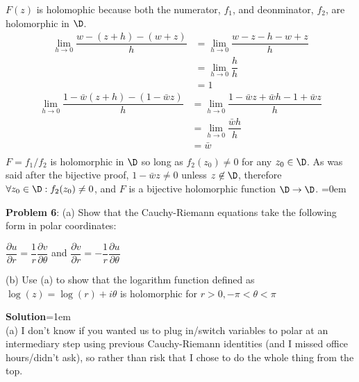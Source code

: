 \documentclass{article}
\begin{document}
$F(z)$ is holomophic because both the numerator, $f_1$, and deonminator, $f_2$, are holomorphic in $\D$.
\begin{align*}
    \lim\limits_{h\to 0} \dfrac{w - (z + h) - (w + z)}{h} &= \lim\limits_{h\to 0} \dfrac{w - z - h - w + z}{h}\\
    &= \lim\limits_{h\to 0} \dfrac{h}{h}\\
    &= 1
\end{align*}
\begin{align*}
    \lim\limits_{h\to 0} \dfrac{1-\bar{w}(z+h)- (1-\bar{w}z)}{h} &= \lim\limits_{h\to 0} \dfrac{1-\bar{w}z+\bar{w}h- 1+\bar{w}z}{h}\\
    &= \lim\limits_{h\to 0} \dfrac{\bar{w}h}{h}\\
    &= \bar{w}\\
\end{align*}
$F = f_1/f_2$ is holomorphic in $\D$ so long as $f_2(z_0) \neq 0$ for any $z_0 \in \D$. As was said after the bijective proof, $1-\bar{w}z \neq 0$ unless $z \not \in \D$, therefore $\forall z_0 \in \D: f_2(z_0) \neq 0$, and $F$ is a bijective holomorphic function $\D \to \D$.
\newpage\parskip=0em
\begin{mdframed}[backgroundcolor=blue!20]
\textbf{Problem 6}: (a) Show that the Cauchy-Riemann equations take the following form in polar coordinates: 
\begin{center}
    $\dfrac{\partial u}{\partial r} = \dfrac{1}{r}\dfrac{\partial v}{\partial \theta}$ and $\dfrac{\partial v}{\partial r} = -\dfrac{1}{r}\dfrac{\partial u}{\partial \theta}$
\end{center}
(b) Use (a) to show that the logarithm function defined as $\log(z) = \log(r) + i\theta$ is holomorphic for $r > 0, -\pi < \theta < \pi$
\end{mdframed}
\textbf{Solution}\parskip=1em\\
(a) I don't know if you wanted us to plug in/switch variables to polar at an intermediary step using previous Cauchy-Riemann identities (and I missed office hours/didn't ask), so rather than risk that I chose to do the whole thing from the top.
\end{document}
